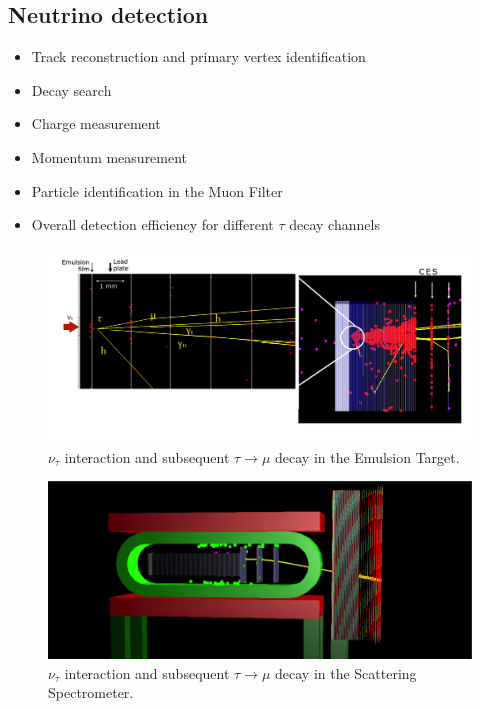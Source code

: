 \subsection{Neutrino detection}
\begin{itemize}
    \item Track reconstruction and primary vertex identification
    \item Decay search
    \item Charge measurement 
    \item Momentum measurement
    \item Particle identification in the Muon Filter
    \item Overall detection efficiency for different $\tau$ decay channels
\end{itemize}

\begin{figure}[htbp]
\centering
\includegraphics[scale=0.5]{figs/ScatteringSpectrometer/NeutrinoRecEmu.png}
\caption{$\nu_\tau$ interaction and subsequent $\tau \to \mu$ decay in the Emulsion Target.}
\label{fig:neutrino_rec_emu}
\end{figure}

\begin{figure}[htbp]
\centering
\includegraphics[scale=0.5]{figs/ScatteringSpectrometer/NeutrinoRecAll.png}
\caption{$\nu_\tau$ interaction and subsequent $\tau \to \mu$ decay in the Scattering Spectrometer.}
\label{fig:neutrino_rec_all}
\end{figure}

